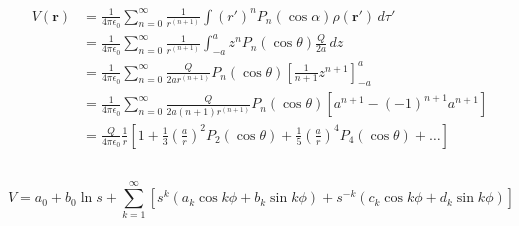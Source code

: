 \documentclass{article}
\renewcommand{\vec}[1]{\boldsymbol{\mathbf{#1}}}
\newcommand{\ke}{\frac{1}{4 \pi \epsilon_0}}
\begin{document}
\begin{align*}
  V(\vec{r}) & = \ke \sum_{n = 0}^\infty \frac{1}{r^{(n + 1)}} \int (r')^n P_n(\cos \alpha) \rho(\vec{r}') \,d \tau'                                                                                      \\
             & = \ke \sum_{n = 0}^\infty \frac{1}{r^{(n + 1)}} \int_{-a}^a z^n P_n(\cos \theta) \frac{Q}{2 a} \,d z                                                                                       \\
             & = \ke \sum_{n = 0}^\infty \frac{Q}{2 a r^{(n + 1)}} P_n(\cos \theta) \left[ \frac{1}{n + 1} z^{n + 1} \right]_{-a}^a                                                                       \\
             & = \ke \sum_{n = 0}^\infty \frac{Q}{2 a (n + 1) r^{(n + 1)}} P_n(\cos \theta) [a^{n + 1} - (-1)^{n + 1} a^{n + 1}]                                                                          \\
             & = \frac{Q}{4 \pi \epsilon_0} \frac{1}{r} \left[ 1 + \frac{1}{3} \left( \frac{a}{r} \right)^2 P_2(\cos \theta) + \frac{1}{5} \left( \frac{a}{r} \right)^4 P_4(\cos \theta) + \ldots \right]
\end{align*}

\subsection{}

\[V = a_0 + b_0 \ln s + \sum_{k = 1}^\infty [s^k (a_k \cos k \phi + b_k \sin k \phi) + s^{-k} (c_k \cos k \phi + d_k \sin k \phi)]\]
\end{document}
